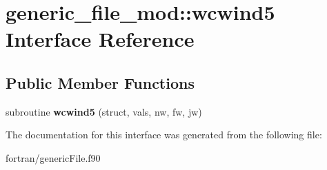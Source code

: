 \hypertarget{interfacegeneric__file__mod_1_1wcwind5}{}\section{generic\+\_\+file\+\_\+mod\+:\+:wcwind5 Interface Reference}
\label{interfacegeneric__file__mod_1_1wcwind5}
\subsection*{Public Member Functions}
\begin{DoxyCompactItemize}
\item 
\mbox{\label{interfacegeneric__file__mod_1_1wcwind5_a055211cd55fdf89c84da8414bb333e36}} 
subroutine {\bfseries wcwind5} (struct, vals, nw, fw, jw)
\end{DoxyCompactItemize}


The documentation for this interface was generated from the following file\+:\begin{DoxyCompactItemize}
\item 
fortran/generic\+File.\+f90\end{DoxyCompactItemize}
